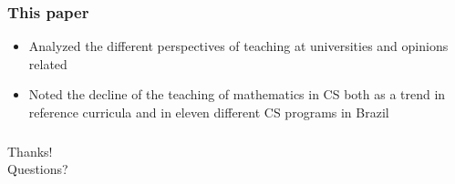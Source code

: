 \documentclass{beamer}
\begin{document}
\begin{frame}
\frametitle{This paper}
\begin{itemize}
	\item Analyzed the different perspectives of teaching at universities and 
	opinions related
	\item Noted the decline of the teaching of mathematics in CS both as a trend
	in reference curricula and in eleven different CS programs in Brazil
\end{itemize}
\end{frame}

\begin{frame}
\frametitle{}

\begin{center}
\Huge Thanks! \\
\Large Questions?
\end{center}

\end{frame}
\end{document}
